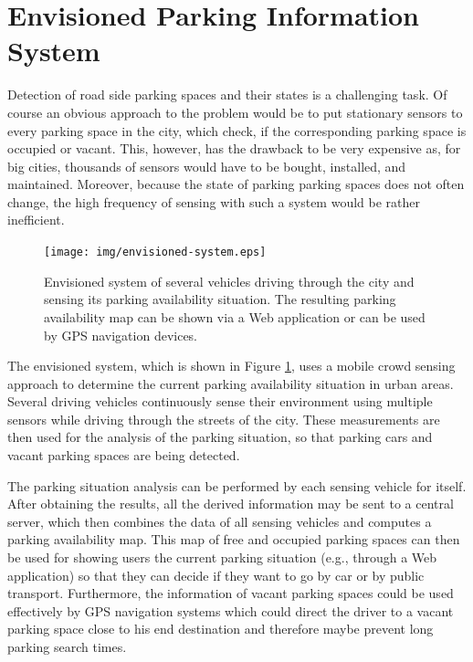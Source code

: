 \section{Envisioned Parking Information System}

Detection of road side parking spaces and their states is a challenging task. Of course an obvious approach to the problem would be to put stationary sensors to every parking space in the city, which check, if the corresponding parking space is occupied or vacant. This, however, has the drawback to be very expensive as, for big cities, thousands of sensors would have to be bought, installed, and maintained. Moreover, because the state of parking parking spaces does not often change, the high frequency of sensing with such a system would be rather inefficient.

\begin{figure}
	\centering
	\texttt{[image: img/envisioned-system.eps]}
	\caption{Envisioned system of several vehicles driving through the city and sensing its parking availability situation. The resulting parking availability map can be shown via a Web application or can be used by GPS navigation devices.}
	\label{fig:envisioned_system}
\end{figure}

The envisioned system, which is shown in Figure \ref{fig:envisioned_system}, uses a mobile crowd sensing approach to determine the current parking availability situation in urban areas. Several driving vehicles continuously sense their environment using multiple sensors while driving through the streets of the city. These measurements are then used for the analysis of the parking situation, so that parking cars and vacant parking spaces are being detected. 

The parking situation analysis can be performed by each sensing vehicle for itself. After obtaining the results, all the derived information may be sent to a central server, which then combines the data of all sensing vehicles and computes a parking availability map. This map of free and occupied parking spaces can then be used for showing users the current parking situation (e.g., through a Web application) so that they can decide if they want to go by car or by public transport. Furthermore, the information of vacant parking spaces could be used effectively by GPS navigation systems which could direct the driver to a vacant parking space close to his end destination and therefore maybe prevent long parking search times.







